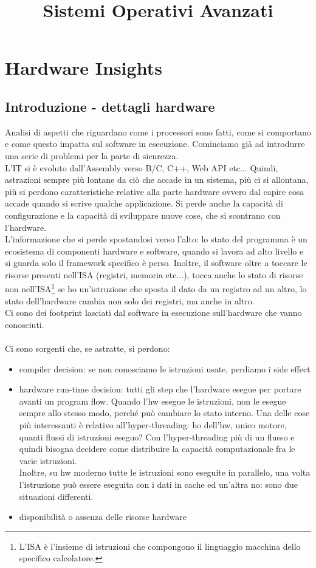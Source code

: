 \documentclass[14pt, oneside]{book}
\title{Sistemi Operativi Avanzati}
\begin{document}
\maketitle
\tableofcontents
\chapter{Hardware Insights}
\section{Introduzione - dettagli hardware}
Analisi di aspetti che riguardano come i processori sono fatti, come si comportano e come questo impatta sul software in esecuzione. Cominciamo già ad introdurre una serie di problemi per la parte di sicurezza.\\ L'IT si è evoluto dall'Assembly verso B/C, C++, Web API etc... Quindi, astrazioni sempre più lontane da ciò che accade in un sistema, più ci si allontana, più si perdono caratteristiche relative alla parte hardware ovvero dal capire cosa accade quando si scrive qualche applicazione. Si perde anche la capacità di configurazione e la capacità di sviluppare nuove cose, che si scontrano con l'hardware.\\ L'informazione che si perde spostandosi verso l'alto: lo stato del programma è un ecosistema di componenti hardware e software, quando si lavora ad alto livello e si guarda solo il framework specifico è perso. Inoltre, il software oltre a toccare le risorse presenti nell'ISA (registri, memoria etc...), tocca anche lo stato di risorse non nell'ISA\footnote{L'ISA è l'insieme di istruzioni che compongono il linguaggio macchina dello specifico calcolatore.} se ho un'istruzione che sposta il dato da un registro ad un altro, lo stato dell'hardware cambia non solo dei registri, ma anche in altro.\\ Ci sono dei footprint lasciati dal software in esecuzione sull'hardware che vanno conosciuti.\\\\ Ci sono sorgenti che, se astratte, si perdono:
\begin{itemize}
\item compiler decision: se non conosciamo le istruzioni usate, perdiamo i side effect
\item hardware run-time decision: tutti gli step che l'hardware esegue per portare avanti un program flow. Quando l'hw esegue le istruzioni, non le esegue sempre allo stesso modo, perché può cambiare lo stato interno. Una delle cose più interessanti è relativo all'hyper-threading: ho dell'hw, unico motore, quanti flussi di istruzioni eseguo? Con l'hyper-threading più di un flusso e quindi bisogna decidere come distribuire la capacità computazionale fra le varie istruzioni. \\ Inoltre, su hw moderno tutte le istruzioni sono eseguite in parallelo, una volta l'istruzione può essere eseguita con i dati in cache ed un'altra no: sono due situazioni differenti.
\item disponibilità o assenza delle risorse hardware
\end{itemize}
\end{document}
